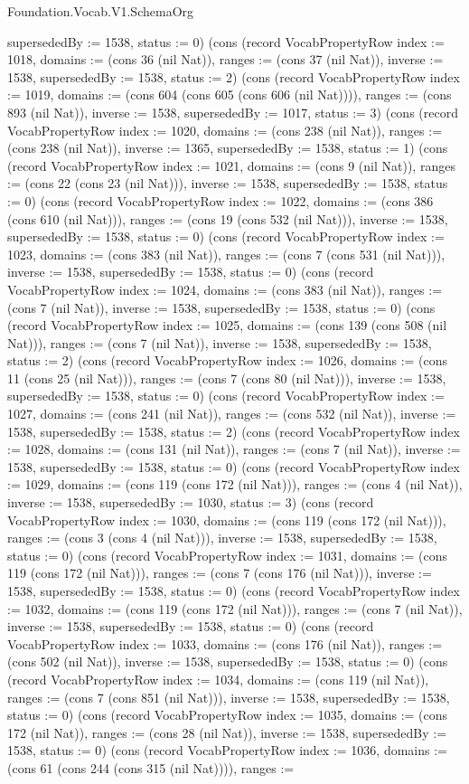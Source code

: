 \begin{lexlean}{Foundation.Vocab.V1.SchemaOrg}
\begin{semanticmodule}
{supersededBy := 1538, status := 0}) (cons (record VocabPropertyRow {index := 1018, domains := (cons 36 (nil Nat)), ranges := (cons 37 (nil Nat)), inverse := 1538, supersededBy := 1538, status := 2}) (cons (record VocabPropertyRow {index := 1019, domains := (cons 604 (cons 605 (cons 606 (nil Nat)))), ranges := (cons 893 (nil Nat)), inverse := 1538, supersededBy := 1017, status := 3}) (cons (record VocabPropertyRow {index := 1020, domains := (cons 238 (nil Nat)), ranges := (cons 238 (nil Nat)), inverse := 1365, supersededBy := 1538, status := 1}) (cons (record VocabPropertyRow {index := 1021, domains := (cons 9 (nil Nat)), ranges := (cons 22 (cons 23 (nil Nat))), inverse := 1538, supersededBy := 1538, status := 0}) (cons (record VocabPropertyRow {index := 1022, domains := (cons 386 (cons 610 (nil Nat))), ranges := (cons 19 (cons 532 (nil Nat))), inverse := 1538, supersededBy := 1538, status := 0}) (cons (record VocabPropertyRow {index := 1023, domains := (cons 383 (nil Nat)), ranges := (cons 7 (cons 531 (nil Nat))), inverse := 1538, supersededBy := 1538, status := 0}) (cons (record VocabPropertyRow {index := 1024, domains := (cons 383 (nil Nat)), ranges := (cons 7 (nil Nat)), inverse := 1538, supersededBy := 1538, status := 0}) (cons (record VocabPropertyRow {index := 1025, domains := (cons 139 (cons 508 (nil Nat))), ranges := (cons 7 (nil Nat)), inverse := 1538, supersededBy := 1538, status := 2}) (cons (record VocabPropertyRow {index := 1026, domains := (cons 11 (cons 25 (nil Nat))), ranges := (cons 7 (cons 80 (nil Nat))), inverse := 1538, supersededBy := 1538, status := 0}) (cons (record VocabPropertyRow {index := 1027, domains := (cons 241 (nil Nat)), ranges := (cons 532 (nil Nat)), inverse := 1538, supersededBy := 1538, status := 2}) (cons (record VocabPropertyRow {index := 1028, domains := (cons 131 (nil Nat)), ranges := (cons 7 (nil Nat)), inverse := 1538, supersededBy := 1538, status := 0}) (cons (record VocabPropertyRow {index := 1029, domains := (cons 119 (cons 172 (nil Nat))), ranges := (cons 4 (nil Nat)), inverse := 1538, supersededBy := 1030, status := 3}) (cons (record VocabPropertyRow {index := 1030, domains := (cons 119 (cons 172 (nil Nat))), ranges := (cons 3 (cons 4 (nil Nat))), inverse := 1538, supersededBy := 1538, status := 0}) (cons (record VocabPropertyRow {index := 1031, domains := (cons 119 (cons 172 (nil Nat))), ranges := (cons 7 (cons 176 (nil Nat))), inverse := 1538, supersededBy := 1538, status := 0}) (cons (record VocabPropertyRow {index := 1032, domains := (cons 119 (cons 172 (nil Nat))), ranges := (cons 7 (nil Nat)), inverse := 1538, supersededBy := 1538, status := 0}) (cons (record VocabPropertyRow {index := 1033, domains := (cons 176 (nil Nat)), ranges := (cons 502 (nil Nat)), inverse := 1538, supersededBy := 1538, status := 0}) (cons (record VocabPropertyRow {index := 1034, domains := (cons 119 (nil Nat)), ranges := (cons 7 (cons 851 (nil Nat))), inverse := 1538, supersededBy := 1538, status := 0}) (cons (record VocabPropertyRow {index := 1035, domains := (cons 172 (nil Nat)), ranges := (cons 28 (nil Nat)), inverse := 1538, supersededBy := 1538, status := 0}) (cons (record VocabPropertyRow {index := 1036, domains := (cons 61 (cons 244 (cons 315 (nil Nat)))), ranges := }
\end{semanticmodule}
\end{lexlean}
